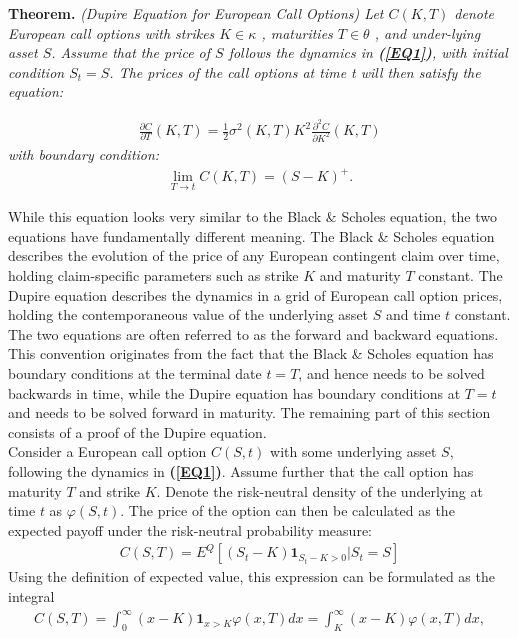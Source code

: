 \documentclass[a4paper, 12pt]{article}
\numberwithin{equation}{subsection}
\begin{document}
\textbf{Theorem. }\textit{(Dupire Equation for European Call Options) Let $C(K, T)$
denote European call options with strikes $K \in \kappa$  , maturities $T \in \theta$ , and under-lying asset $S$. Assume that the price of $S$ follows the dynamics in \textbf{(\ref{EQ1})}, with initial condition $S_t = S$. The prices of the call options at time t will then satisfy the equation:}


\begin{align}\label{EQDupire}
	\frac{\partial C}{\partial T}(K,T) = \frac{1}{2}\sigma^2(K,T)K^2\frac{\partial ^ 2 C}{\partial K^2}(K,T)
\end{align} 
\textit{with boundary condition:}
\begin{align}
	 \lim_{T \to t}C(K,T) = (S - K)^+.
\end{align} 

While this equation looks very similar to the Black \& Scholes equation, the two equations have fundamentally different meaning. The Black \& Scholes equation describes the evolution of the price of any European contingent claim over time, holding claim-specific parameters such as strike $K$ and maturity $T$ constant. The Dupire equation describes the dynamics in a grid of European call option prices, holding the contemporaneous value of the underlying asset $S$ and time $t$ constant. The two equations are often referred to as the forward and backward equations. This convention originates from the fact that the Black \& Scholes equation has boundary conditions at the terminal date $t = T$, and hence needs to be solved backwards in time, while the Dupire equation has boundary conditions at $T = t$ and needs to be solved forward in maturity. The remaining part of this section consists of a proof of the Dupire equation.\\

Consider a European call option $C(S, t)$ with some underlying asset $S$, following
the dynamics in \textbf{(\ref{EQ1})}. Assume further that the call option has maturity $T$ and
strike $K$. Denote the risk-neutral density of the underlying at time $t$ as $\varphi(S, t)$.
The price of the option can then be calculated as the expected payoff under the risk-neutral probability measure:
\begin{align}
	 C(S,T) = E^{Q}{[(S_t - K)\textbf{1}_{S_t - K>0}|S_t = S]}
\end{align} 
Using the definition of expected value, this expression can be formulated as the integral
\begin{align}\label{CallDupire}
	 C(S,T) = \int _0^\infty (x - K) \textbf{1}_{x>K}\varphi(x,T)dx = \int _K^\infty (x - K)\varphi(x,T)dx,
\end{align} 
\end{document}
